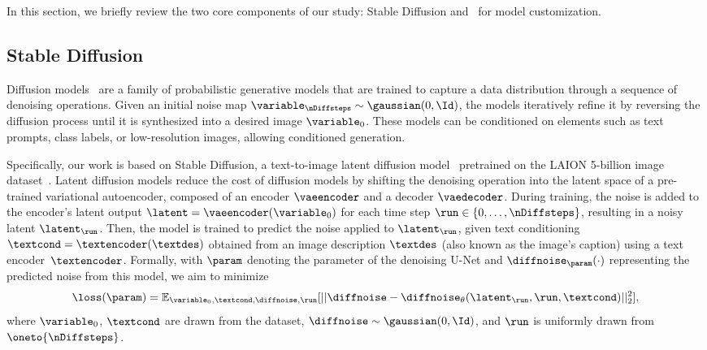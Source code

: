 In this section, we briefly review the two core components of our study: Stable Diffusion and \lora~for model customization.

\subsection{Stable Diffusion}
\label{subsec:sd}

Diffusion models~\citep{sohl2015deep,ho2020denoising} are a family of probabilistic generative models that are trained to capture a data distribution %
through a sequence of denoising operations.
Given an initial noise map $\mathbf{\variable}_{\nDiffsteps} \sim \gaussian(0, \Id)$, the models iteratively refine it by reversing the diffusion process until it is synthesized into a desired image $\variable_{0}$. These models can be conditioned on elements such as text prompts, class labels, or low-resolution images,
allowing conditioned generation. 

Specifically, our work is based on Stable Diffusion, a text-to-image latent diffusion model~\citep{rombach2022high} pretrained on the LAION 5-billion image dataset~\citep{schuhmann2022laion}.
Latent diffusion models reduce the cost of diffusion models by shifting the denoising operation into the latent space of a pre-trained variational autoencoder, composed of an encoder $\vaeencoder$ and a decoder $\vaedecoder$.
During training, the noise is added to the encoder's latent output $\latent=\vaeencoder(\variable_0)$ for each time step $\run\in \{0, \dots, \nDiffsteps\}$, resulting in a noisy latent $\latent_{\run}$.
Then, the model is trained to predict the noise applied to $\latent_{\run}$, given text conditioning $\textcond=\textencoder (\textdes)$ obtained from an image description $\textdes$ (also known as the image's caption) using a text encoder~$\textencoder$.
Formally, with $\param$ denoting the parameter of the denoising U-Net and $\diffnoise_\param(\cdot)$ representing the predicted noise from this model, we aim to minimize
%
\begin{equation}
\label{eq:SD-loss}
\loss(\param) = \mathbb{E}_{\variable_0,\textcond,\diffnoise,\run}[||\diffnoise - \diffnoise_\theta(\latent_{\run},\run,\textcond)||^2_2],
\end{equation}
%
where $\variable_0$, $\textcond$ are drawn from the dataset, $\diffnoise\sim\gaussian(0, \Id)$, and $\run$ is uniformly drawn from $\oneto{\nDiffsteps}$. 
 




